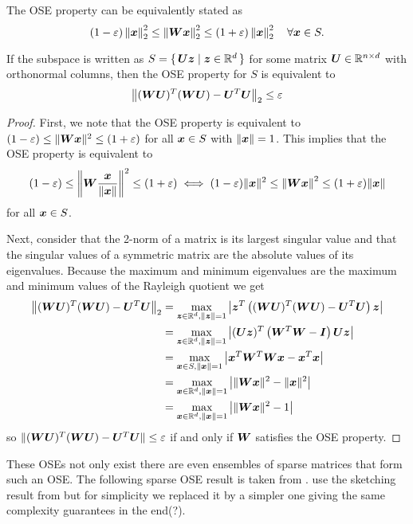 \begin{theorem}
The OSE property can be equivalently stated as
\[ (1-\varepsilon) \left\lVert \bm{x} \right\rVert_2^2 \leq \left\lVert \bm{W}\bm{x} \right\rVert_2^2 \leq (1+\varepsilon) \left\lVert \bm{x} \right\rVert_2^2 \quad \forall \bm{x} \in S. \label{ose-inequality} \]

If the subspace is written as \(S = \set{ \bm{U}\bm{z} | \bm{z} \in \mathbb{R}^d }\) for some matrix \(\bm{U} \in \mathbb{R}^{n \times d}\) with orthonormal columns, then the OSE property for \(S\) is equivalent to
\[ \left\lVert (\bm{W}\bm{U})^T (\bm{W} \bm{U}) - \bm{U}^T \bm{U} \right\rVert_2 \leq \varepsilon \] 
\end{theorem}
\begin{proof}
First, we note that the OSE property is equivalent to \((1-\varepsilon) \leq \lVert \bm{W}\bm{x} \rVert^2 \leq (1+\varepsilon)\) for all \(\bm{x} \in S\) with \(\lVert \bm{x} \rVert = 1\).
This implies that the OSE property is equivalent to
\[     (1-\varepsilon) \leq \left\lVert \bm{W}\frac{\bm{x}}{\lVert \bm{x} \rVert} \right\rVert^2 \leq (1+\varepsilon)
  \iff (1-\varepsilon)\lVert \bm{x} \rVert^2 \leq \left\lVert \bm{W}\bm{x} \right\rVert^2 \leq (1+\varepsilon)\lVert \bm{x} \rVert
\]
for all \(\bm{x} \in S\).

Next, consider that the 2-norm of a matrix is its largest singular value and that the singular values of a symmetric matrix are the absolute values of its eigenvalues. 
Because the maximum and minimum eigenvalues are the maximum and minimum values of the Rayleigh quotient we get
\begin{align*}
  \left\lVert (\bm{W}\bm{U})^T (\bm{W} \bm{U}) - \bm{U}^T \bm{U} \right\rVert_2
  &= \max_{\bm{z} \in \mathbb{R}^d, \lVert \bm{z} \rVert=1} \left\lvert \bm{z}^T \left( (\bm{W}\bm{U})^T (\bm{W} \bm{U}) - \bm{U}^T \bm{U} \right) \bm{z} \right\rvert \\
  &= \max_{\bm{z} \in \mathbb{R}^d, \lVert \bm{z} \rVert=1} \left\lvert (\bm{U}\bm{z})^T \left( \bm{W}^T \bm{W} - \bm{I} \right) \bm{U}\bm{z} \right\rvert \\
  &= \max_{\bm{x} \in S, \lVert \bm{x} \rVert=1} \left\lvert \bm{x}^T \bm{W}^T \bm{W} \bm{x} - \bm{x}^T \bm{x} \right\rvert \\
  &= \max_{\bm{x} \in \mathbb{R}^d, \lVert \bm{x} \rVert=1} \left\lvert \lVert \bm{W}\bm{x} \rVert^2 - \lVert \bm{x} \rVert^2 \right\rvert \\
  &= \max_{\bm{x} \in \mathbb{R}^d, \lVert \bm{x} \rVert=1} \left\lvert \lVert \bm{W}\bm{x} \rVert^2 - 1 \right\rvert
\end{align*}
so \(\lVert (\bm{W}\bm{U})^T (\bm{W}\bm{U}) - \bm{U}^T \bm{U} \rVert \leq \varepsilon\) if and only if \(\bm{W}\) satisfies the OSE property.
\end{proof}

These OSEs not only exist there are even ensembles of sparse matrices that form such an OSE.
The following sparse OSE result is taken from \cite{Cohen-NearlyTightObliviousSubspaceEmbeddings}.
\Textcite{Avron-FasterRandomizedInfeasibleIPMs} use the sketching result from \cite{Cohen-OptimalApproximateMatrixProduct} but for simplicity we replaced it by a simpler one giving the same complexity guarantees in the end(?).

